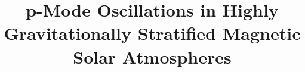 \documentclass[twocolumn]{aastex62}
\begin{document}
\title{p-Mode Oscillations in Highly Gravitationally Stratified Magnetic Solar Atmospheres}


\end{document}
